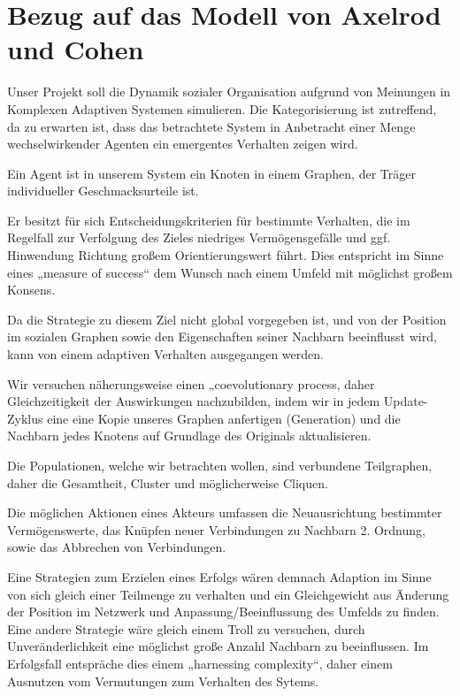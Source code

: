 \documentclass[11pt, a4paper]{scrartcl}
\begin{document}
\section{Bezug auf das Modell von Axelrod und Cohen}


Unser Projekt soll die Dynamik sozialer Organisation aufgrund von Meinungen in Komplexen Adaptiven Systemen simulieren. Die Kategorisierung ist zutreffend, da zu erwarten ist, dass das betrachtete System in Anbetracht einer Menge wechselwirkender Agenten ein emergentes Verhalten zeigen wird. 

Ein Agent ist in unserem System ein Knoten in einem Graphen, der Träger individueller Geschmacksurteile ist.

Er besitzt für sich Entscheidungskriterien für bestimmte Verhalten, die im Regelfall zur Verfolgung des Zieles niedriges Vermögensgefälle und ggf. Hinwendung Richtung großem Orientierungswert  führt. Dies entspricht im Sinne eines „measure of success“ dem Wunsch nach einem Umfeld mit möglichst großem Konsens.

Da die Strategie zu diesem Ziel nicht global vorgegeben ist, und von der Position im sozialen Graphen sowie den Eigenschaften seiner Nachbarn beeinflusst wird, kann von einem adaptiven Verhalten ausgegangen werden.

Wir versuchen näherungsweise einen „coevolutionary process, daher Gleichzeitigkeit der Auswirkungen nachzubilden, indem wir in jedem Update-Zyklus eine eine Kopie unseres Graphen anfertigen (Generation) und die Nachbarn jedes Knotens auf Grundlage des Originals aktualisieren.

Die Populationen, welche wir betrachten wollen, sind verbundene Teilgraphen, daher die Gesamtheit, Cluster und möglicherweise Cliquen.

Die möglichen Aktionen eines Akteurs umfassen die Neuausrichtung bestimmter Vermögenswerte, das Knüpfen neuer Verbindungen zu Nachbarn 2. Ordnung, sowie das Abbrechen von Verbindungen.

Eine Strategien zum Erzielen  eines Erfolgs wären demnach Adaption im Sinne von sich gleich einer Teilmenge zu verhalten und ein Gleichgewicht aus Änderung der Position im Netzwerk und Anpassung/Beeinflussung des Umfelds zu finden.
Eine andere Strategie wäre gleich einem Troll zu versuchen, durch Unveränderlichkeit eine möglichst große Anzahl Nachbarn zu beeinflussen. Im Erfolgsfall entspräche dies einem „harnessing complexity“, daher einem Ausnutzen vom Vermutungen zum Verhalten des Sytems.
\end{document}

